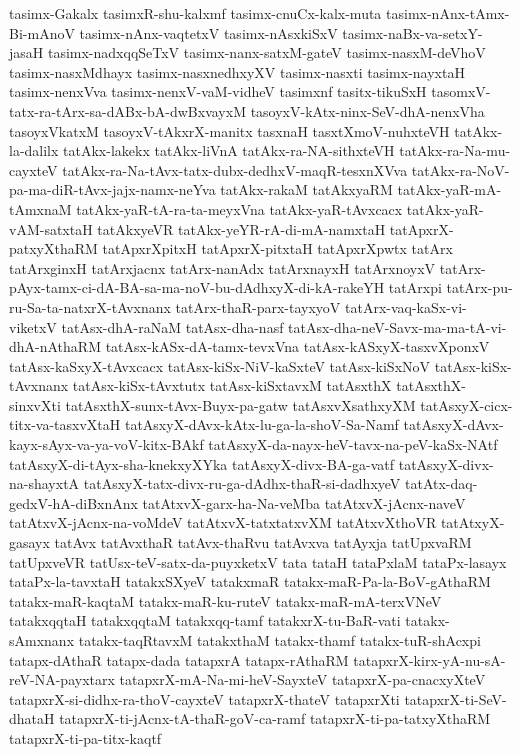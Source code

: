 {tasimx-Gakalx
tasimxR-shu-kalxmf
tasimx-cnuCx-kalx-muta
tasimx-nAnx-tAmx-Bi-mAnoV
tasimx-nAnx-vaqtetxV
tasimx-nAsxkiSxV
tasimx-naBx-va-setxY-jasaH
tasimx-nadxqqSeTxV
tasimx-nanx-satxM-gateV
tasimx-nasxM-deVhoV
tasimx-nasxMdhayx
tasimx-nasxnedhxyXV
tasimx-nasxti
tasimx-nayxtaH
tasimx-nenxVva
tasimx-nenxV-vaM-vidheV
tasimxnf
tasitx-tikuSxH
tasomxV-tatx-ra-tArx-sa-dABx-bA-dwBxvayxM
tasoyxV-kAtx-ninx-SeV-dhA-nenxVha
tasoyxVkatxM
tasoyxV-tAkxrX-manitx
tasxnaH
tasxtXmoV-nuhxteVH
tatAkx-la-dalilx
tatAkx-lakekx
tatAkx-liVnA
tatAkx-ra-NA-sithxteVH
tatAkx-ra-Na-mu-cayxteV
tatAkx-ra-Na-tAvx-tatx-dubx-dedhxV-maqR-tesxnXVva
tatAkx-ra-NoV-pa-ma-diR-tAvx-jajx-namx-neYva
tatAkx-rakaM
tatAkxyaRM
tatAkx-yaR-mA-tAmxnaM
tatAkx-yaR-tA-ra-ta-meyxVna
tatAkx-yaR-tAvxcacx
tatAkx-yaR-vAM-satxtaH
tatAkxyeVR
tatAkx-yeYR-rA-di-mA-namxtaH
tatApxrX-patxyXthaRM
tatApxrXpitxH
tatApxrX-pitxtaH
tatApxrXpwtx
tatArx
tatArxginxH
tatArxjacnx
tatArx-nanAdx
tatArxnayxH
tatArxnoyxV
tatArx-pAyx-tamx-ci-dA-BA-sa-ma-noV-bu-dAdhxyX-di-kA-rakeYH
tatArxpi
tatArx-pu-ru-Sa-ta-natxrX-tAvxnanx
tatArx-thaR-parx-tayxyoV
tatArx-vaq-kaSx-vi-viketxV
tatAsx-dhA-raNaM
tatAsx-dha-nasf
tatAsx-dha-neV-Savx-ma-ma-tA-vi-dhA-nAthaRM
tatAsx-kASx-dA-tamx-tevxVna
tatAsx-kASxyX-tasxvXponxV
tatAsx-kaSxyX-tAvxcacx
tatAsx-kiSx-NiV-kaSxteV
tatAsx-kiSxNoV
tatAsx-kiSx-tAvxnanx
tatAsx-kiSx-tAvxtutx
tatAsx-kiSxtavxM
tatAsxthX
tatAsxthX-sinxvXti
tatAsxthX-sunx-tAvx-Buyx-pa-gatw
tatAsxvXsathxyXM
tatAsxyX-cicx-titx-va-tasxvXtaH
tatAsxyX-dAvx-kAtx-lu-ga-la-shoV-Sa-Namf
tatAsxyX-dAvx-kayx-sAyx-va-ya-voV-kitx-BAkf
tatAsxyX-da-nayx-heV-tavx-na-peV-kaSx-NAtf
tatAsxyX-di-tAyx-sha-knekxyXYka
tatAsxyX-divx-BA-ga-vatf
tatAsxyX-divx-na-shayxtA
tatAsxyX-tatx-divx-ru-ga-dAdhx-thaR-si-dadhxyeV
tatAtx-daq-gedxV-hA-diBxnAnx
tatAtxvX-garx-ha-Na-veMba
tatAtxvX-jAcnx-naveV
tatAtxvX-jAcnx-na-voMdeV
tatAtxvX-tatxtatxvXM
tatAtxvXthoVR
tatAtxyX-gasayx
tatAvx
tatAvxthaR
tatAvx-thaRvu
tatAvxva
tatAyxja
tatUpxvaRM
tatUpxveVR
tatUsx-teV-satx-da-puyxketxV
tata
tataH
tataPxlaM
tataPx-lasayx
tataPx-la-tavxtaH
tatakxSXyeV
tatakxmaR
tatakx-maR-Pa-la-BoV-gAthaRM
tatakx-maR-kaqtaM
tatakx-maR-ku-ruteV
tatakx-maR-mA-terxVNeV
tatakxqqtaH
tatakxqqtaM
tatakxqq-tamf
tatakxrX-tu-BaR-vati
tatakx-sAmxnanx
tatakx-taqRtavxM
tatakxthaM
tatakx-thamf
tatakx-tuR-shAcxpi
tatapx-dAthaR
tatapx-dada
tatapxrA
tatapx-rAthaRM
tatapxrX-kirx-yA-nu-sA-reV-NA-payxtarx
tatapxrX-mA-Na-mi-heV-SayxteV
tatapxrX-pa-cnacxyXteV
tatapxrX-si-didhx-ra-thoV-cayxteV
tatapxrX-thateV
tatapxrXti
tatapxrX-ti-SeV-dhataH
tatapxrX-ti-jAcnx-tA-thaR-goV-ca-ramf
tatapxrX-ti-pa-tatxyXthaRM
tatapxrX-ti-pa-titx-kaqtf
}

